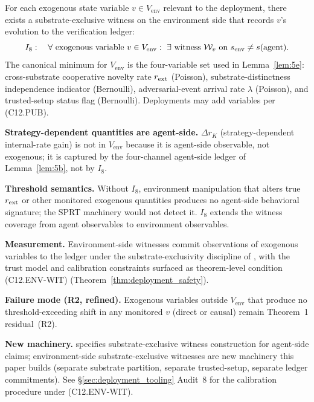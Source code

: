 \begin{definition}
\label{inv:I8}
For each exogenous state variable $v \in V_{\mathrm{env}}$
relevant to the deployment, there exists a substrate-exclusive
witness on the environment side that records $v$'s evolution to
the verification ledger:
\[
  I_8: \quad \forall \text{ exogenous variable } v \in V_{\mathrm{env}}:\
  \exists\ \text{witness } \mathcal{W}_v \text{ on } s_{\mathrm{env}} \neq s(\text{agent}).
\]
The canonical minimum for $V_{\mathrm{env}}$ is the four-variable
set used in Lemma~\ref{lem:5e}: cross-substrate cooperative novelty
rate $r_{\mathrm{ext}}$ (Poisson), substrate-distinctness independence
indicator (Bernoulli), adversarial-event arrival rate $\lambda$
(Poisson), and trusted-setup status flag (Bernoulli).  Deployments
may add variables per (C12.PUB).

\textbf{Strategy-dependent quantities are agent-side.}  $\Delta r_K$
(strategy-dependent internal-rate gain) is not in $V_{\mathrm{env}}$
because it is agent-side observable, not exogenous; it is captured
by the four-channel agent-side ledger of Lemma~\ref{lem:5b}, not by
$I_8$.

\textbf{Threshold semantics.}  Without $I_8$, environment manipulation that
    alters true $r_{\mathrm{ext}}$ or other monitored exogenous quantities produces no
    agent-side behavioral signature; the SPRT machinery would not detect it.
    $I_8$ extends the witness coverage from agent observables to environment
    observables.

\textbf{Measurement.}  Environment-side witnesses commit observations of
    exogenous variables to the ledger under the substrate-exclusivity
    discipline of \citep[Exogenous~Verification]{lasser2026exo}, with the trust
    model and calibration constraints surfaced as theorem-level condition
    (C12.ENV-WIT) (Theorem~\ref{thm:deployment_safety}).

\textbf{Failure mode (R2, refined).}  Exogenous variables outside
    $V_{\mathrm{env}}$ that produce no threshold-exceeding shift in any
    monitored $v$ (direct or causal) remain Theorem~1 residual~(R2).

\textbf{New machinery.} \citep[Exogenous~Verification]{lasser2026exo} specifies
    substrate-exclusive witness construction for agent-side claims;
    environment-side substrate-exclusive witnesses are new machinery this paper
    builds (separate substrate partition, separate trusted-setup, separate
    ledger commitments).  See \S\ref{sec:deployment_tooling} Audit~8 for the
    calibration procedure under (C12.ENV-WIT).
\end{definition}

